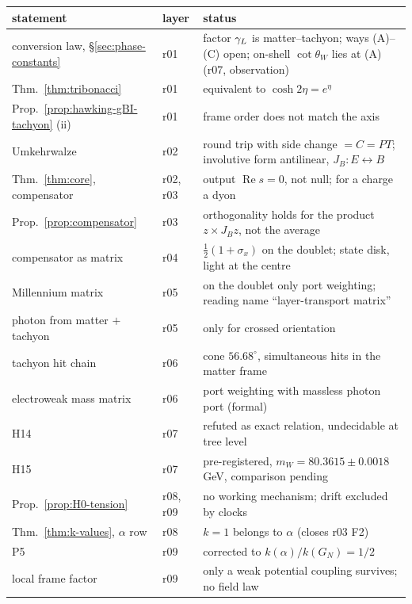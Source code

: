 \begin{center}
\small
\begin{tabular}{@{}>{\raggedright\arraybackslash}p{}>{\raggedright\arraybackslash}p{}>{\raggedright\arraybackslash}p{}@{}}
\toprule
statement & layer & status\\
\midrule
conversion law, \S\ref{sec:phase-constants} & r01 & factor \(\gamma_L\) is matter--tachyon; ways (A)--(C) open; on-shell \(\cot\theta_W\) lies at (A) (r07, observation)\\
Thm.~\ref{thm:tribonacci} & r01 & equivalent to \(\cosh2\eta=e^\eta\)\\
Prop.~\ref{prop:hawking-gBI-tachyon} (ii) & r01 & frame order does not match the axis\\
Umkehrwalze & r02 & round trip with side change \(=C=PT\); involutive form antilinear, \(J_B\colon E\leftrightarrow B\)\\
Thm.~\ref{thm:core}, compensator & r02, r03 & output \(\operatorname{Re}s=0\), not null; for a charge a dyon\\
Prop.~\ref{prop:compensator} & r03 & orthogonality holds for the product \(z\times J_Bz\), not the average\\
compensator as matrix & r04 & \(\tfrac12(1+\sigma_x)\) on the doublet; state disk, light at the centre\\
Millennium matrix & r05 & on the doublet only port weighting; reading name ``layer-transport matrix''\\
photon from matter \(+\) tachyon & r05 & only for crossed orientation\\
tachyon hit chain & r06 & cone \(56.68^\circ\), simultaneous hits in the matter frame\\
electroweak mass matrix & r06 & port weighting with massless photon port (formal)\\
H14 & r07 & refuted as exact relation, undecidable at tree level\\
H15 & r07 & pre-registered, \(m_W=80.3615\pm0.0018\) GeV, comparison pending\\
Prop.~\ref{prop:H0-tension} & r08, r09 & no working mechanism; drift excluded by clocks\\
Thm.~\ref{thm:k-values}, \(\alpha\) row & r08 & \(k=1\) belongs to \(\alpha\) (closes r03 F2)\\
P5 & r09 & corrected to \(k(\alpha)/k(G_N)=1/2\)\\
local frame factor & r09 & only a weak potential coupling survives; no field law\\

\end{tabular}
\end{center}
